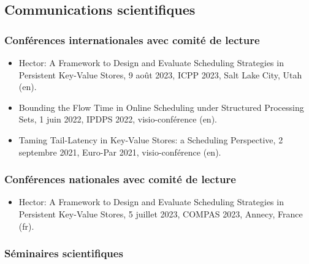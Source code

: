 \documentclass[12pt]{article}
\begin{document}

\subsection{Communications scientifiques}

\subsubsection*{Conférences internationales avec comité de lecture}

\begin{itemize}
    \item \foreignlanguage{english}{Hector: A Framework to Design and Evaluate Scheduling Strategies
    in Persistent Key-Value Stores}, 9 août 2023, ICPP 2023, Salt Lake City, Utah (en).
    \item \foreignlanguage{english}{Bounding the Flow Time in Online Scheduling under Structured
    Processing Sets}, 1 juin 2022, IPDPS 2022, visio-conférence (en).
    \item \foreignlanguage{english}{Taming Tail-Latency in Key-Value Stores: a Scheduling
    Perspective}, 2 septembre 2021, Euro-Par 2021, visio-conférence (en).
\end{itemize}

\subsubsection*{Conférences nationales avec comité de lecture}

\begin{itemize}
  \item \foreignlanguage{english}{Hector: A Framework to Design and Evaluate Scheduling Strategies
  in Persistent Key-Value Stores}, 5 juillet 2023, COMPAS 2023, Annecy, France (fr).
\end{itemize}

\subsubsection*{Séminaires scientifiques}
\end{document}
